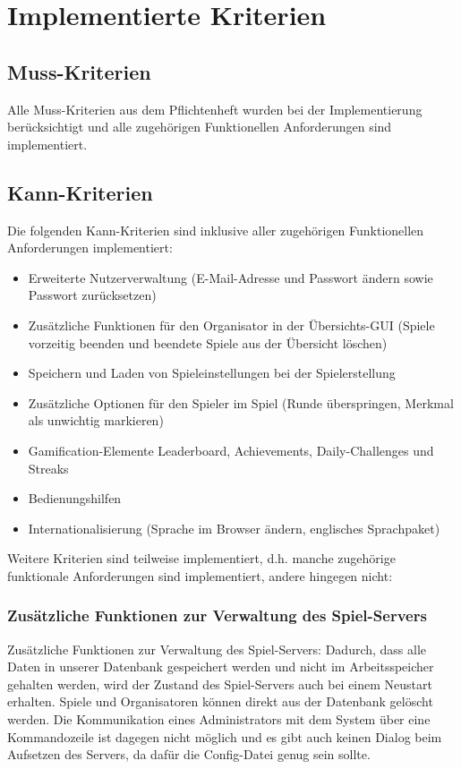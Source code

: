\documentclass[a4paper]{scrreprt}
\begin{document}
\chapter{Implementierte Kriterien}

\section{Muss-Kriterien}
Alle Muss-Kriterien aus dem Pflichtenheft wurden bei der Implementierung berücksichtigt und alle zugehörigen Funktionellen Anforderungen sind implementiert.


\section{Kann-Kriterien}
Die folgenden Kann-Kriterien sind inklusive aller zugehörigen Funktionellen Anforderungen implementiert:

\begin{itemize}
\item Erweiterte Nutzerverwaltung (E-Mail-Adresse und Passwort ändern sowie Passwort zurücksetzen)
\item Zusätzliche Funktionen für den Organisator in der Übersichts-GUI (Spiele vorzeitig beenden und beendete Spiele aus der Übersicht löschen)
\item Speichern und Laden von Spieleinstellungen bei der Spielerstellung
\item Zusätzliche Optionen für den Spieler im Spiel (Runde überspringen, Merkmal als unwichtig markieren)
\item Gamification-Elemente Leaderboard, Achievements, Daily-Challenges und Streaks
\item Bedienungshilfen %
\item Internationalisierung (Sprache im Browser ändern, englisches Sprachpaket)
\end{itemize}

\hspace{1cm}

Weitere Kriterien sind teilweise implementiert, d.h. manche zugehörige funktionale Anforderungen sind implementiert, andere hingegen nicht:

\subsection{Zusätzliche Funktionen zur Verwaltung des Spiel-Servers}
Zusätzliche Funktionen zur Verwaltung des Spiel-Servers: Dadurch, dass alle Daten in unserer Datenbank gespeichert werden und nicht im Arbeitsspeicher gehalten werden, wird der Zustand des Spiel-Servers auch bei einem Neustart erhalten. Spiele und Organisatoren können direkt aus der Datenbank gelöscht werden. Die Kommunikation eines Administrators mit dem System über eine Kommandozeile ist dagegen nicht möglich und es gibt auch keinen Dialog beim Aufsetzen des Servers, da dafür die Config-Datei genug sein sollte.  
\end{document}
